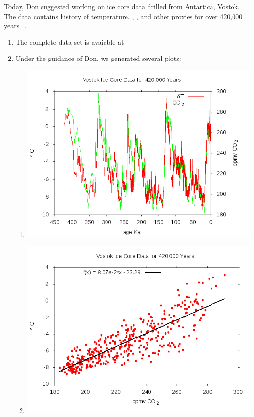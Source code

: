 Today, Don suggested working on ice core data drilled from Antartica, Vostok. The data contains history of temperature, , , and other proxies for over 420,000 years ~\citep{PJR-JJ-RD:1999}.
\begin{enumerate}
  \item The complete data set is avaiable at 
  \item Under the guidance of Don, we generated several plots:
    \begin{enumerate}
      \item \includegraphics[scale=0.5]{00LOG/2017-07-12/00FIGURES/VOSTOK_T_CO2.png}
      \item \includegraphics[scale=0.5]{00LOG/2017-07-12/00FIGURES/VOSTOK_ppmv_CO2_vs_deltaT_linear_fit.png}

\end{enumerate}
\end{enumerate}
